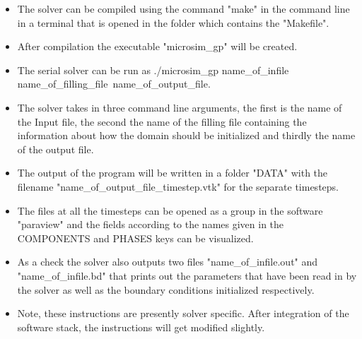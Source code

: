 \documentclass[a4paper,10pt]{article}
\begin{document}
\begin{itemize}
 \item The solver can be compiled using the command "make" in the command line in a terminal that is opened in the folder which contains the "Makefile".
 \item After compilation the executable "microsim\_gp" will be created. 
 \item The serial solver can be run as ./microsim\_gp name\_of\_infile name\_of\_filling\_file\ name\_of\_output\_file.
 \item The solver takes in three command line arguments, the first is the name of the Input file, the second the name of the filling file containing the information about how the domain 
 should be initialized and thirdly the name of the output file.
 \item The output of the program will be written in a folder "DATA" with the filename "name\_of\_output\_file\_timestep.vtk" for the separate timesteps.
 \item The files at all the timesteps can be opened as a group in the software "paraview" and the fields according to the names given in the COMPONENTS and PHASES keys can be visualized.
 \item As a check the solver also outputs two files "name\_of\_infile.out" and "name\_of\_infile.bd" that prints out the parameters that have been read in by the solver as well as the 
 boundary conditions initialized respectively.
 \item Note, these instructions are presently solver specific. After integration of the software stack, the instructions will get modified slightly.
\end{itemize}
\end{document}
